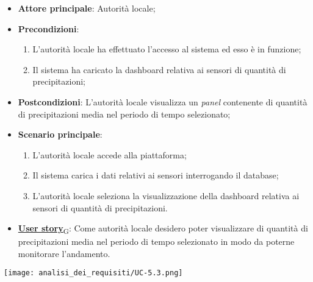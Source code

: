 \begin{itemize}
	\item \textbf{Attore principale}: Autorità locale;
	\item \textbf{Precondizioni}:
	      \begin{enumerate}
		      \item L'autorità locale ha effettuato l'accesso al sistema ed esso è in funzione;
		      \item Il sistema ha caricato la dashboard relativa ai sensori di quantità di precipitazioni;
	      \end{enumerate}
	\item \textbf{Postcondizioni}: L'autorità locale visualizza un \textit{panel} contenente di quantità di precipitazioni media nel periodo di tempo selezionato;
	\item \textbf{Scenario principale}:
	      \begin{enumerate}
		      \item L'autorità locale accede alla piattaforma;
		      \item Il sistema carica i dati relativi ai sensori interrogando il database;
		      \item L'autorità locale seleziona la visualizzazione della dashboard relativa ai sensori di quantità di precipitazioni.
	      \end{enumerate}
	\item \href{https://7last.github.io/docs/rtb/documentazione-interna/glossario\#user-story}{\textbf{User story}\textsubscript{G}}: Come autorità locale desidero poter visualizzare di quantità di precipitazioni media nel periodo di tempo selezionato
	      in modo da poterne monitorare l'andamento.
\end{itemize}
\begin{center}
	\texttt{[image: analisi\_dei\_requisiti/UC-5.3.png]}
\end{center}

